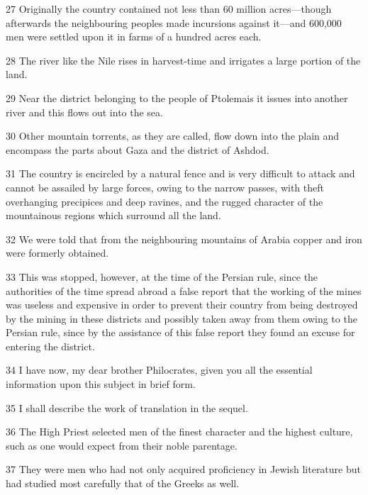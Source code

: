 \par 27 Originally the country contained not less than 60 million acres—though afterwards the neighbouring peoples made incursions against it—and 600,000 men were settled upon it in farms of a hundred acres each.

\par 28 The river like the Nile rises in harvest-time and irrigates a large portion of the land.

\par 29 Near the district belonging to the people of Ptolemais it issues into another river and this flows out into the sea.

\par 30 Other mountain torrents, as they are called, flow down into the plain and encompass the parts about Gaza and the district of Ashdod.

\par 31 The country is encircled by a natural fence and is very difficult to attack and cannot be assailed by large forces, owing to the narrow passes, with theft overhanging precipices and deep ravines, and the rugged character of the mountainous regions which surround all the land.

\par 32 We were told that from the neighbouring mountains of Arabia copper and iron were formerly obtained.

\par 33 This was stopped, however, at the time of the Persian rule, since the authorities of the time spread abroad a false report that the working of the mines was useless and expensive in order to prevent their country from being destroyed by the mining in these districts and possibly taken away from them owing to the Persian rule, since by the assistance of this false report they found an excuse for entering the district.

\par 34 I have now, my dear brother Philocrates, given you all the essential information upon this subject in brief form.

\par 35 I shall describe the work of translation in the sequel.

\par 36 The High Priest selected men of the finest character and the highest culture, such as one would expect from their noble parentage.

\par 37 They were men who had not only acquired proficiency in Jewish literature but had studied most carefully that of the Greeks as well.

